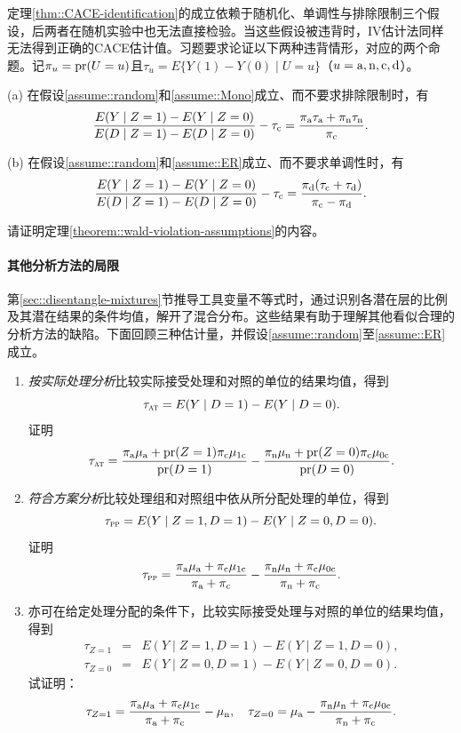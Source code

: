 定理\ref{thm::CACE-identification}的成立依赖于随机化、单调性与排除限制三个假设，后两者在随机实验中也无法直接检验。当这些假设被违背时，IV估计法同样无法得到正确的CACE估计值。习题要求论证以下两种违背情形，对应\citet{angrist1996identification}的两个命题。记$\pi_u = \textup{pr}(U=u)$且$\tau_u = E\{  Y(1) - Y(0) \mid U=u \}$（$u=\textup{a}, \textup{n}, \textup{c}, \textup{d}$）。 


\begin{theorem}
\label{theorem::wald-violation-assumptions}
(a) 在假设\ref{assume::random}和\ref{assume::Mono}成立、而不要求排除限制时，有$$
\frac{ E(Y\mid Z=1) - E(Y\mid Z=0) }{ E(D\mid Z=1) - E(D \mid Z=0) } - \tau_{\textup{c}} 
= \frac{  \pi_{\textup{a}} \tau_{\textup{a}} + \pi_{\textup{n}} \tau_{\textup{n}}  }{  \pi_{\textup{c}} } .
$$
 

(b) 在假设\ref{assume::random}和\ref{assume::ER}成立、而不要求单调性时，有$$
\frac{ E(Y\mid Z=1) - E(Y\mid Z=0) }{ E(D\mid Z=1) - E(D \mid Z=0) } - \tau_{\textup{c}} 
= \frac{  \pi_{\textup{d}} (\tau_{\textup{c}} + \tau_{\textup{d}} )  }{   \pi_{\textup{c}} - \pi_{\textup{d}}   }.
$$
\end{theorem}
 
请证明定理\ref{theorem::wald-violation-assumptions}的内容。 

 
 \paragraph{其他分析方法的局限}\label{problem::as-treated-analysis}

第\ref{sec::disentangle-mixtures}节推导工具变量不等式时，通过识别各潜在层的比例及其潜在结果的条件均值，解开了混合分布。这些结果有助于理解其他看似合理的分析方法的缺陷。下面回顾三种估计量，并假设\ref{assume::random}至\ref{assume::ER}成立。   


\begin{enumerate}
\item 
{\it 按实际处理分析}比较实际接受处理和对照的单位的结果均值，得到$$
\tau_\textsc{at} = E(Y\mid D=1) - E(Y\mid D=0).
$$证明$$
\tau_\textsc{at} = \frac{  \pi_{\textup{a}} \mu_{\textup{a}} + \textup{pr}(Z=1)\pi_{\textup{c}} \mu_{1\textup{c}}   }{   \textup{pr}(D=1) } 
- \frac{  \pi_{\textup{n}} \mu_{\textup{n}} + \textup{pr}(Z=0) \pi_{\textup{c}} \mu_{0\textup{c}}   }{   \textup{pr}(D=0) } .
$$


\item 
{\it 符合方案分析}比较处理组和对照组中依从所分配处理的单位，得到$$
\tau_\textsc{pp} = E(Y\mid Z=1, D=1) - E(Y\mid Z=0, D=0).
$$证明$$
\tau_\textsc{pp} =\frac{  \pi_{\textup{a}} \mu_{\textup{a}} + \pi_{\textup{c}} \mu_{1\textup{c}} }{  \pi_{\textup{a}}   + \pi_{\textup{c}} }
- \frac{  \pi_{\textup{n}} \mu_{\textup{n}} + \pi_{\textup{c}} \mu_{0\textup{c}} }{  \pi_{\textup{n}}   + \pi_{\textup{c}} }.
$$


\item 
亦可在给定处理分配的条件下，比较实际接受处理与对照的单位的结果均值，得到
\begin{eqnarray*}
\tau_{Z=1} &=& E(Y\mid Z=1, D=1) - E(Y\mid Z=1, D=0),\\ 
\tau_{Z=0} &=& E(Y\mid Z=0, D=1) - E(Y\mid Z=0, D=0).
\end{eqnarray*}
试证明：
$$
\tau_{Z=1}  = \frac{  \pi_{\textup{a}} \mu_{\textup{a}} + \pi_{\textup{c}} \mu_{1\textup{c}} }{  \pi_{\textup{a}}   + \pi_{\textup{c}} } - \mu_{\textup{n}},\quad
\tau_{Z=0} = \mu_{\textup{a}} - \frac{  \pi_{\textup{n}} \mu_{\textup{n}} + \pi_{\textup{c}} \mu_{0\textup{c}} }{  \pi_{\textup{n}}   + \pi_{\textup{c}} }.
$$
\end{enumerate}
 

